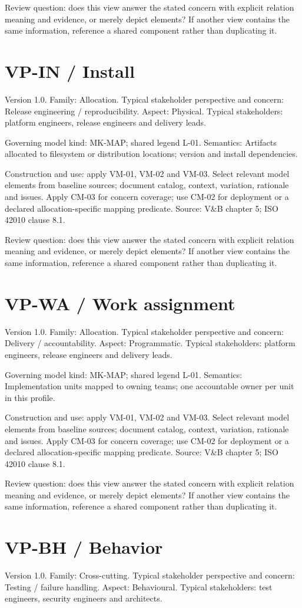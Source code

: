 \documentclass[11pt,letterpaper]{article}
\newcommand{\docsection}[1]{\Needspace{5\baselineskip}\section{#1}}
\begin{document}
Review question: does this view answer the stated concern with explicit relation meaning and evidence, or merely depict elements? If another view contains the same information, reference a shared component rather than duplicating it.

\docsection{VP-IN / Install}
Version 1.0. Family: Allocation. Typical stakeholder perspective and concern: Release engineering / reproducibility. Aspect: Physical. Typical stakeholders: platform engineers, release engineers and delivery leads.

Governing model kind: MK-MAP; shared legend L-01. Semantics: Artifacts allocated to filesystem or distribution locations; version and install dependencies.

Construction and use: apply VM-01, VM-02 and VM-03. Select relevant model elements from baseline sources; document catalog, context, variation, rationale and issues. Apply CM-03 for concern coverage; use CM-02 for deployment or a declared allocation-specific mapping predicate. Source: V\&B chapter 5; ISO 42010 clause 8.1.

Review question: does this view answer the stated concern with explicit relation meaning and evidence, or merely depict elements? If another view contains the same information, reference a shared component rather than duplicating it.

\docsection{VP-WA / Work assignment}
Version 1.0. Family: Allocation. Typical stakeholder perspective and concern: Delivery / accountability. Aspect: Programmatic. Typical stakeholders: platform engineers, release engineers and delivery leads.

Governing model kind: MK-MAP; shared legend L-01. Semantics: Implementation units mapped to owning teams; one accountable owner per unit in this profile.

Construction and use: apply VM-01, VM-02 and VM-03. Select relevant model elements from baseline sources; document catalog, context, variation, rationale and issues. Apply CM-03 for concern coverage; use CM-02 for deployment or a declared allocation-specific mapping predicate. Source: V\&B chapter 5; ISO 42010 clause 8.1.

Review question: does this view answer the stated concern with explicit relation meaning and evidence, or merely depict elements? If another view contains the same information, reference a shared component rather than duplicating it.

\docsection{VP-BH / Behavior}
Version 1.0. Family: Cross-cutting. Typical stakeholder perspective and concern: Testing / failure handling. Aspect: Behavioural. Typical stakeholders: test engineers, security engineers and architects.
\end{document}
